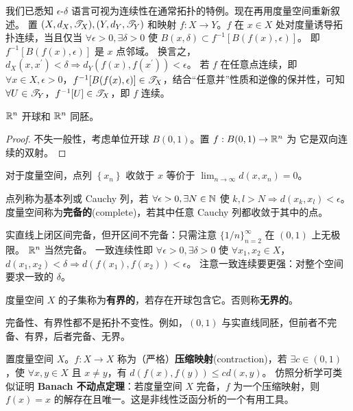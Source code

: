 我们已悉知 $\epsilon$-$\delta$ 语言可视为连续性在通常拓扑的特例。现在再用度量空间重新叙述。
置 $(X,d_X,\mathscr T_X),(Y,d_Y,\mathscr T_Y)$ 和映射 $f:X\to Y$。$f$ 在 $x \in X$ 处对度量诱导拓扑连续，当且仅当 $\forall\epsilon>0,\exists\delta>0$ 使 $B(x,\delta) \subset f^{-1} [B(f(x),\epsilon)]$。
即 $f^{-1} [B(f(x),\epsilon)]$ 是 $x$ 点邻域。
换言之，$d_X(x,x^{\prime})<\delta\Rightarrow d_Y(f(x),f(x^{\prime}))<\epsilon$。
若 $f$ 在任意点连续，即 $\forall x \in X,\epsilon > 0$，$f^{-1} [B(f(x),\epsilon)]\in\mathscr T_X$，结合“任意并”性质和逆像的保并性，可知 $\forall U\in\mathscr T_Y$，$f^{-1}[U]\in\mathscr T_X$，即 $f$ 连续。

\begin{theorem}
    $\mathbb{R}^n$ 开球和 $\mathbb{R}^n$ 同胚。
\end{theorem}
\begin{proof}
    不失一般性，考虑单位开球 $B(0,1)$。置 $f:B(0,1)\to \mathbb{R}^n$ 为
它是双向连续的双射。
\end{proof}

对于度量空间，点列 $\left\{x_n\right\}$ 收敛于 $x$ 等价于 $\lim_{n\to\infty}d(x, x_n)=0$。
\begin{definition}\label{def:complete-metric-space}
点列称为基本列或 Cauchy 列，若 $\forall\epsilon>0,\exists N\in\mathbb{N}$ 使 $k,l>N\Rightarrow d(x_k,x_l)<\epsilon$。
度量空间称为\textbf{完备的}(complete)，若其中任意 Cauchy 列都收敛于其中的点。
\end{definition}
%
实直线上闭区间完备，但开区间不完备：只需注意 $\{1/n\}_{n=2}^\infty$ 在 $(0,1)$ 上无极限。
$\mathbb{R}^{n}$ 当然完备。
一致连续性即 $\forall \epsilon>0,\exists\delta>0$ 
使 $\forall x_{1},x_{2} \in X$，$d(x_{1},x_{2})<\delta\Rightarrow d(f(x_{1}),f(x_{2}))<\epsilon$。
注意一致连续要更强：对整个空间要求一致的 $\delta$。

\begin{definition}
    度量空间 $X$ 的子集称为\textbf{有界的}，若存在开球包含它。否则称\textbf{无界的}。
\end{definition}

\begin{remark}
    完备性、有界性都不是拓扑不变性。例如，$(0,1)$ 与实直线同胚，但前者不完备、有界，后者完备、无界。
\end{remark}

置度量空间 $X$。$f: X \to X$ 称为（严格）\textbf{压缩映射}(contraction)，若 $\exists c\in(0,1)$，使 $\forall x,y \in X$ 且 $x\ne y$，有 $d(f(x),f(y)) \leqslant c d(x,y)$。
仿照分析学可类似证明 \textbf{Banach 不动点定理}：若度量空间 $X$ 完备，$f$ 为一个压缩映射，则 $f(x)=x$ 的解存在且唯一。这是非线性泛函分析的一个有用工具。

